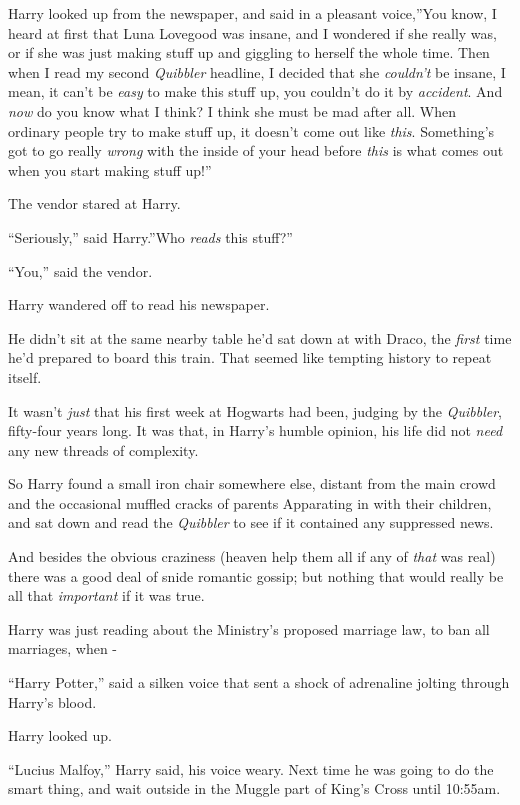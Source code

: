 Harry looked up from the newspaper, and said in a pleasant voice,''You
know, I heard at first that Luna Lovegood was insane, and I wondered if
she really was, or if she was just making stuff up and giggling to
herself the whole time. Then when I read my second \emph{Quibbler}
headline, I decided that she \emph{couldn't} be insane, I mean, it can't
be \emph{easy} to make this stuff up, you couldn't do it by
\emph{accident}. And \emph{now} do you know what I think? I think she
must be mad after all. When ordinary people try to make stuff up, it
doesn't come out like \emph{this}. Something's got to go really
\emph{wrong} with the inside of your head before \emph{this} is what
comes out when you start making stuff up!''

The vendor stared at Harry.

``Seriously,'' said Harry.''Who \emph{reads} this stuff?''

``You,'' said the vendor.

Harry wandered off to read his newspaper.

He didn't sit at the same nearby table he'd sat down at with Draco, the
\emph{first} time he'd prepared to board this train. That seemed like
tempting history to repeat itself.

It wasn't \emph{just} that his first week at Hogwarts had been, judging
by the \emph{Quibbler}, fifty-four years long. It was that, in Harry's
humble opinion, his life did not \emph{need} any new threads of
complexity.

So Harry found a small iron chair somewhere else, distant from the main
crowd and the occasional muffled cracks of parents Apparating in with
their children, and sat down and read the \emph{Quibbler} to see if it
contained any suppressed news.

And besides the obvious craziness (heaven help them all if any of
\emph{that} was real) there was a good deal of snide romantic gossip;
but nothing that would really be all that \emph{important} if it was
true.

Harry was just reading about the Ministry's proposed marriage law, to
ban all marriages, when -

``Harry Potter,'' said a silken voice that sent a shock of adrenaline
jolting through Harry's blood.

Harry looked up.

``Lucius Malfoy,'' Harry said, his voice weary. Next time he was going
to do the smart thing, and wait outside in the Muggle part of King's
Cross until 10:55am.

